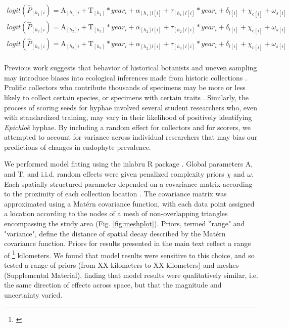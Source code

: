 \documentclass[11pt]{article}
\let\cite\citep
\newcommand{\josh}[2]{{\color{orange}{#1}}\footnote{\textit{\color{orange}{#2}}}}
\begin{document}
\begin{subequations}
	\label{eq:trends}
	\begin{align}
		logit(\hat{P}_{[h_{1}]i}) =  \mathrm{A}_{[h_{1}]i} + \mathrm{T}_{[h_{1}]}*year_i  + \alpha_{[h_{1}]l[i]} + \tau_{[h_{1}]l[i]}*year_i  + \delta_{l[i]}+ \chi_{c[i]} + \omega_{s[i]} \\
		logit(\hat{P}_{[h_{2}]i}) = \mathrm{A}_{[h_{2}]i} + \mathrm{T}_{[h_{2}]}*year_i  + \alpha_{[h_{2}]l[i]} + \tau_{[h_{2}]l[i]}*year_i  + \delta_{l[i]}+ \chi_{c[i]} + \omega_{s[i]} \\
		logit(\hat{P}_{[h_{3}]i}) = \mathrm{A}_{[h_{2}]i} + \mathrm{T}_{[h_{2}]}*year_i  + \alpha_{[h_{2}]l[i]} + \tau_{[h_{3}]l[i]}*year_i  + \delta_{l[i]}+ \chi_{c[i]} + \omega_{s[i]}\\
	\end{align}
\end{subequations}


Previous work suggests that behavior of historical botanists and uneven sampling may introduce biases into ecological inferences made from historic collections \cite{kozlov2020biases}. 
Prolific collectors who contribute thousands of specimens may be more or less likely to collect certain species, or specimens with certain traits \cite{daru2018widespread}. 
Similarly, the process of scoring seeds for hyphae involved several student researchers who, even with standardized training, may vary in their likelihood of positively identifying \emph{Epichloë} hyphae. 
By including a random effect for collectors and for scorers, we attempted to account for variance across individual researchers that may bias our predictions of changes in endophyte prevalence.


We performed model fitting using the inlabru R package \citep{}.
Global parameters $\mathrm{A}$, and $\mathrm{T}$, and i.i.d. random effects were given penalized complexity priors $\chi$ and $\omega$. 
Each spatially-structured parameter depended on a covariance matrix according to the proximity of each collection location \citep{lindgren2011explicit,bakka2018spatial}. 
The covariance matrix was approximated using a Mat\'{e}rn covariance function, with each data point assigned a location according to the nodes of a mesh of non-overlapping triangles encompassing the study area (Fig. \ref{fig:meshplot}).
Priors, termed ''range" and "variance", define the distance of spatial decay described by the Mat\'{e}rn covariance function.
Priors for results presented in the main text reflect a range of \josh{XX}{} kilometers. 
We found that model results were sensitive to this choice, and so tested a range of priors (from XX kilometers to XX kilometers) and meshes (Supplemental Material), finding that model results were qualitatively similar, i.e. the same direction of effects across space, but that the magnitude and uncertainty varied. 
\end{document}
